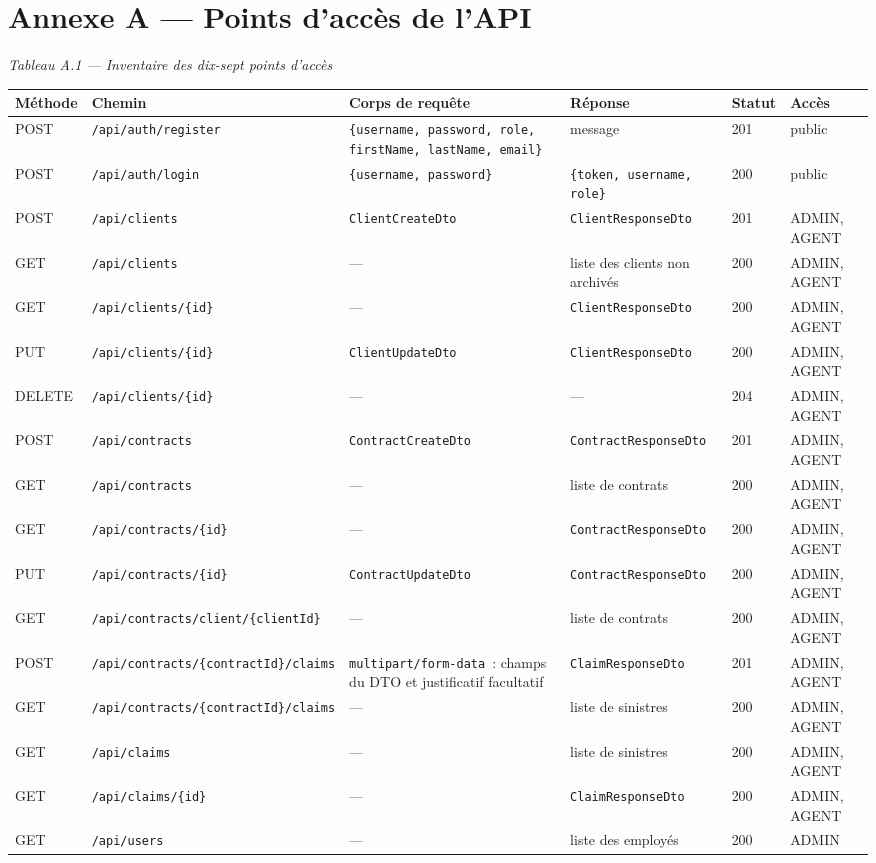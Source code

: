 \documentclass[12pt,a4paper]{report}
\begin{document}
\chapter*{Annexe A — Points d'accès de l'API}
\begin{center}\textit{Tableau A.1 — Inventaire des dix-sept points d'accès}\end{center}
{\small
\begin{tabularx}{\linewidth}{|X|X|X|X|X|X|}
\hline
\textbf{Méthode} & \textbf{Chemin} & \textbf{Corps de requête} & \textbf{Réponse} & \textbf{Statut} & \textbf{Accès} \\ \hline
POST & \texttt{/api/auth/register} & \texttt{\{username, password, role, firstName, lastName, email\}} & message & 201 & public \\ \hline
POST & \texttt{/api/auth/login} & \texttt{\{username, password\}} & \texttt{\{token, username, role\}} & 200 & public \\ \hline
POST & \texttt{/api/clients} & \texttt{ClientCreateDto} & \texttt{ClientResponseDto} & 201 & ADMIN, AGENT \\ \hline
GET & \texttt{/api/clients} & — & liste des clients non archivés & 200 & ADMIN, AGENT \\ \hline
GET & \texttt{/api/clients/\{id\}} & — & \texttt{ClientResponseDto} & 200 & ADMIN, AGENT \\ \hline
PUT & \texttt{/api/clients/\{id\}} & \texttt{ClientUpdateDto} & \texttt{ClientResponseDto} & 200 & ADMIN, AGENT \\ \hline
DELETE & \texttt{/api/clients/\{id\}} & — & — & 204 & ADMIN, AGENT \\ \hline
POST & \texttt{/api/contracts} & \texttt{ContractCreateDto} & \texttt{ContractResponseDto} & 201 & ADMIN, AGENT \\ \hline
GET & \texttt{/api/contracts} & — & liste de contrats & 200 & ADMIN, AGENT \\ \hline
GET & \texttt{/api/contracts/\{id\}} & — & \texttt{ContractResponseDto} & 200 & ADMIN, AGENT \\ \hline
PUT & \texttt{/api/contracts/\{id\}} & \texttt{ContractUpdateDto} & \texttt{ContractResponseDto} & 200 & ADMIN, AGENT \\ \hline
GET & \texttt{/api/contracts/client/\{clientId\}} & — & liste de contrats & 200 & ADMIN, AGENT \\ \hline
POST & \texttt{/api/contracts/\{contractId\}/claims} & \texttt{multipart/form-data}~: champs du DTO et justificatif facultatif & \texttt{ClaimResponseDto} & 201 & ADMIN, AGENT \\ \hline
GET & \texttt{/api/contracts/\{contractId\}/claims} & — & liste de sinistres & 200 & ADMIN, AGENT \\ \hline
GET & \texttt{/api/claims} & — & liste de sinistres & 200 & ADMIN, AGENT \\ \hline
GET & \texttt{/api/claims/\{id\}} & — & \texttt{ClaimResponseDto} & 200 & ADMIN, AGENT \\ \hline
GET & \texttt{/api/users} & — & liste des employés & 200 & ADMIN \\ \hline
\end{tabularx}

}
\end{document}
